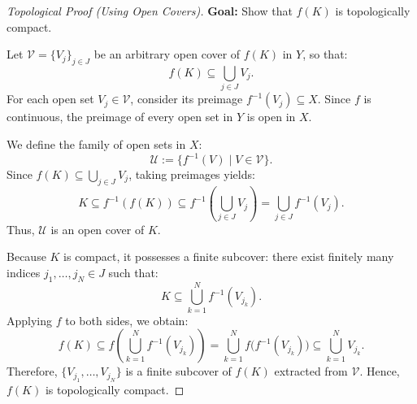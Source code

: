 \begin{content}

\begin{proof}[Topological Proof (Using Open Covers)]
\textbf{Goal:} Show that $f(K)$ is topologically compact.

Let $\mathcal{V} = \{V_j\}_{j \in J}$ be an arbitrary open cover of $f(K)$ in $Y$, so that:
\[
f(K) \subseteq \bigcup_{j \in J} V_j.
\]
For each open set $V_j \in \mathcal{V}$, consider its preimage $f^{-1}(V_j) \subseteq X$. Since $f$ is continuous, the preimage of every open set in $Y$ is open in $X$.

We define the family of open sets in $X$:
\begin{equation}\label{eq:pullback-cover}
\mathcal{U} := \bigl\{ f^{-1}(V) \;\big|\; V \in \mathcal{V} \bigr\}.
\end{equation}
Since $f(K) \subseteq \bigcup_{j \in J} V_j$, taking preimages yields:
\[
K \subseteq f^{-1}(f(K)) \subseteq f^{-1}\left( \bigcup_{j \in J} V_j \right) = \bigcup_{j \in J} f^{-1}(V_j).
\]
Thus, $\mathcal{U}$ is an open cover of $K$.

Because $K$ is compact, it possesses a finite subcover: there exist finitely many indices $j_1, \dots, j_N \in J$ such that:
\begin{equation}\label{eq:finite-subcover-K}
K \subseteq \bigcup_{k=1}^N f^{-1}(V_{j_k}).
\end{equation}
Applying $f$ to both sides, we obtain:
\begin{equation}\label{eq:finite-subcover-fK}
f(K) \subseteq f\left( \bigcup_{k=1}^N f^{-1}(V_{j_k}) \right) = \bigcup_{k=1}^N f\bigl(f^{-1}(V_{j_k})\bigr) \subseteq \bigcup_{k=1}^N V_{j_k}.
\end{equation}
Therefore, $\{V_{j_1}, \dots, V_{j_N}\}$ is a finite subcover of $f(K)$ extracted from $\mathcal{V}$. Hence, $f(K)$ is topologically compact.
\end{proof}


\end{content}
